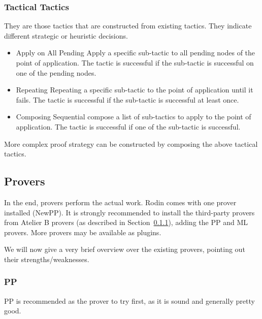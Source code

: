 \subsubsection{Tactical Tactics}

They are those tactics that are constructed from existing tactics. They indicate different strategic or heuristic decisions.

\begin{itemize}
	\item         Apply on All Pending Apply a specific sub-tactic to all pending nodes of the point of application. The tactic is successful if the sub-tactic is successful on one of the pending nodes. 
	\item         Repeating Repeating a specific sub-tactic to the point of application until it fails. The tactic is successful if the sub-tactic is successful at least once. 
	\item         Composing Sequential compose a list of sub-tactics to apply to the point of application. The tactic is successful if one of the sub-tactic is successful. 
\end{itemize}

More complex proof strategy can be constructed by composing the above tactical tactics. 

\subsection{Provers}

In the end, provers perform the actual work.  Rodin comes with one prover installed (NewPP).  It is strongly recommended to install the third-party provers from Atelier B provers (as described in Section~\ref{}), adding the PP and ML provers.  More provers may be available as plugins.

We will now give a very brief overview over the existing provers, pointing out their strengths/weaknesses.

\subsubsection{PP}

PP is recommended as the prover to try first, as it is sound and generally pretty good.

